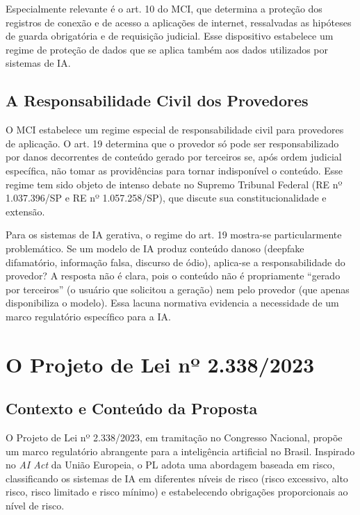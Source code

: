 Especialmente relevante é o art. 10 do MCI, que determina a proteção dos registros de conexão e de acesso a aplicações de internet, ressalvadas as hipóteses de guarda obrigatória e de requisição judicial. Esse dispositivo estabelece um regime de proteção de dados que se aplica também aos dados utilizados por sistemas de IA.

\subsection{A Responsabilidade Civil dos Provedores}
\label{subsec:responsabilidade-mci}

O MCI estabelece um regime especial de responsabilidade civil para provedores de aplicação. O art. 19 determina que o provedor só pode ser responsabilizado por danos decorrentes de conteúdo gerado por terceiros se, após ordem judicial específica, não tomar as providências para tornar indisponível o conteúdo. Esse regime tem sido objeto de intenso debate no Supremo Tribunal Federal (RE nº 1.037.396/SP e RE nº 1.057.258/SP), que discute sua constitucionalidade e extensão.

Para os sistemas de IA gerativa, o regime do art. 19 mostra-se particularmente problemático. Se um modelo de IA produz conteúdo danoso (deepfake difamatório, informação falsa, discurso de ódio), aplica-se a responsabilidade do provedor? A resposta não é clara, pois o conteúdo não é propriamente ``gerado por terceiros'' (o usuário que solicitou a geração) nem pelo provedor (que apenas disponibiliza o modelo). Essa lacuna normativa evidencia a necessidade de um marco regulatório específico para a IA.

\section{O Projeto de Lei nº 2.338/2023}
\label{sec:pl-2338}

\subsection{Contexto e Conteúdo da Proposta}
\label{subsec:contexto-pl}

O Projeto de Lei nº 2.338/2023, em tramitação no Congresso Nacional, propõe um marco regulatório abrangente para a inteligência artificial no Brasil. Inspirado no \textit{AI Act} da União Europeia, o PL adota uma abordagem baseada em risco, classificando os sistemas de IA em diferentes níveis de risco (risco excessivo, alto risco, risco limitado e risco mínimo) e estabelecendo obrigações proporcionais ao nível de risco.

